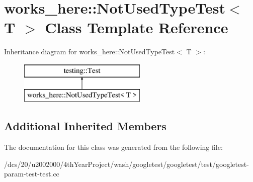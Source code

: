 \hypertarget{classworks__here_1_1NotUsedTypeTest}{}\section{works\+\_\+here\+:\+:Not\+Used\+Type\+Test$<$ T $>$ Class Template Reference}
\label{classworks__here_1_1NotUsedTypeTest}
Inheritance diagram for works\+\_\+here\+:\+:Not\+Used\+Type\+Test$<$ T $>$\+:\begin{figure}[H]
\begin{center}
\leavevmode
\includegraphics[height=2.000000cm]{classworks__here_1_1NotUsedTypeTest}
\end{center}
\end{figure}
\subsection*{Additional Inherited Members}


The documentation for this class was generated from the following file\+:\begin{DoxyCompactItemize}
\item 
/dcs/20/u2002000/4th\+Year\+Project/wash/googletest/googletest/test/googletest-\/param-\/test-\/test.\+cc\end{DoxyCompactItemize}
